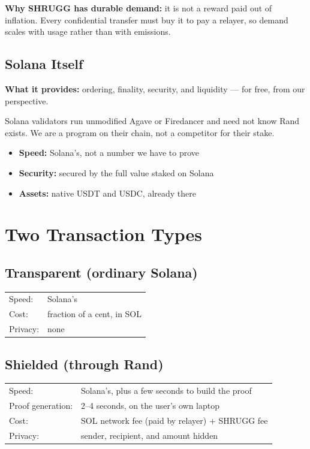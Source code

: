 \documentclass[11pt,a4paper]{article}
\begin{document}
\textbf{Why SHRUGG has durable demand:} it is not a reward paid out of inflation. Every confidential transfer must buy it to pay a relayer, so demand scales with usage rather than with emissions.

\subsection{Solana Itself}

\textbf{What it provides:} ordering, finality, security, and liquidity --- for free, from our perspective.

Solana validators run unmodified Agave or Firedancer and need not know Rand exists. We are a program on their chain, not a competitor for their stake.

\begin{itemize}[leftmargin=*]
    \item \textbf{Speed:} Solana's, not a number we have to prove
    \item \textbf{Security:} secured by the full value staked on Solana
    \item \textbf{Assets:} native USDT and USDC, already there
\end{itemize}

\section{Two Transaction Types}

\subsection{Transparent (ordinary Solana)}

\begin{tabular}{@{}ll@{}}
Speed: & Solana's \\
Cost: & fraction of a cent, in SOL \\
Privacy: & none \\
\end{tabular}

\subsection{Shielded (through Rand)}

\begin{tabular}{@{}ll@{}}
Speed: & Solana's, plus a few seconds to build the proof \\
Proof generation: & 2--4 seconds, on the user's own laptop \\
Cost: & SOL network fee (paid by relayer) + SHRUGG fee \\
Privacy: & sender, recipient, and amount hidden \\
\end{tabular}
\end{document}
